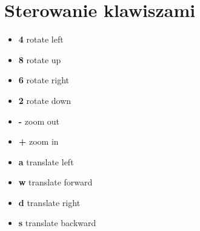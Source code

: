 \documentclass[11pt,a4paper]{article}
\begin{document}
	
	
	\newcommand{\signItem}[1]{\item[\textbf{#1}]}
	\section{Sterowanie klawiszami}
	\begin{itemize}
		\signItem{4} rotate left
		\signItem{8} rotate up
		\signItem{6} rotate right
		\signItem{2} rotate down
		\signItem{-} zoom out
		\signItem{+} zoom in
		\signItem{a} translate left
		\signItem{w} translate forward
		\signItem{d} translate right
		\signItem{s} translate	backward
	\end{itemize}
	
\end{document}
